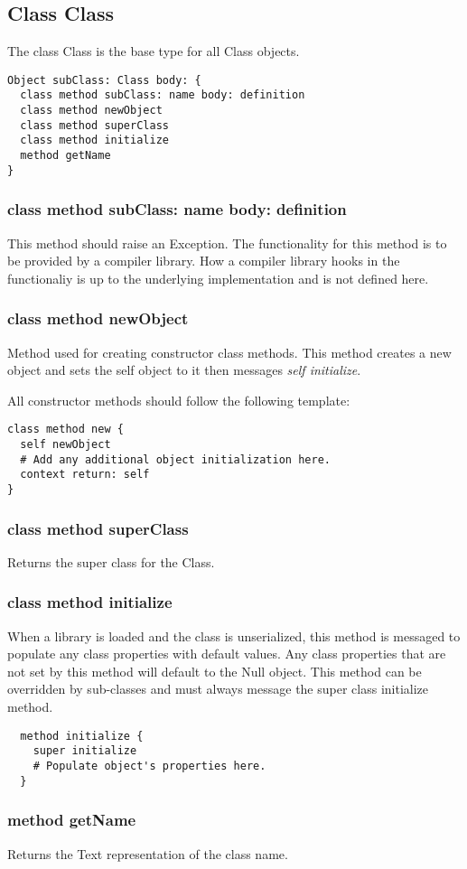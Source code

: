 \newpage
\subsection{Class Class}

The class Class is the base type for all Class objects.

\begin{lstlisting}
Object subClass: Class body: {
  class method subClass: name body: definition
  class method newObject
  class method superClass
  class method initialize
  method getName
}
\end{lstlisting}

\subsubsection{class method subClass: name body: definition}
This method should raise an Exception. The functionality for this method
is to be provided by a compiler library. How a compiler library hooks in the
functionaliy is up to the underlying implementation and is not defined here.

\subsubsection{class method newObject}
\label{sec:class_method_newobject}
Method used for creating constructor class methods. This method creates a new
object and sets the self object to it then messages \textit{self initialize}.

All constructor methods should follow the following template:

\begin{lstlisting}
class method new {
  self newObject
  # Add any additional object initialization here.
  context return: self
}
\end{lstlisting}

\subsubsection{class method superClass}
Returns the super class for the Class.

\subsubsection{class method initialize}
When a library is loaded and the class is unserialized, this method is
messaged to populate any class properties with default values. Any class
properties that are not set by this method will default to the Null object.
This method can be overridden by sub-classes and must always message the
super class initialize method.

\begin{lstlisting}
  method initialize {
    super initialize
    # Populate object's properties here.
  }
\end{lstlisting}

\subsubsection{method getName}
Returns the Text representation of the class name.
